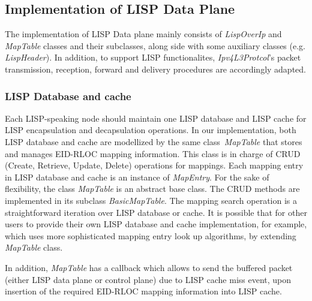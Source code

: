 \subsection{Implementation of LISP Data Plane}
\label{subsec:modifyInternet}
The implementation of LISP Data plane mainly consists of \emph{LispOverIp} and \emph{MapTable} classes and their subclasses, along side with some auxiliary classes (e.g. \emph{LispHeader}). In addition, to support LISP functionalites, \emph{Ipv4L3Protcol}'s packet transmission, reception, forward and delivery procedures are accordingly adapted.
\subsubsection{LISP Database and cache}
\label{subsec:database-impl}
Each LISP-speaking node should maintain one LISP database and LISP cache for LISP encapsulation and decapsulation operations. In our implementation, both LISP database and cache are modellized by the same class~\emph{MapTable} that stores and manages EID-RLOC mapping information. This class is in charge of CRUD (Create, Retrieve, Update, Delete) operations for mappings. Each mapping entry in LISP database and cache is an instance of \emph{MapEntry}. For the sake of flexibility, the class \emph{MapTable} is an abstract base class. The CRUD methods are implemented in its subclass \emph{BasicMapTable}. The mapping search operation is a straightforward iteration over LISP database or cache. It is possible that for other users to provide their own LISP database and cache implementation, for example, which uses more sophisticated mapping entry look up algorithms, by extending \emph{MapTable} class.

In addition, \emph{MapTable} has a callback which allows to send the buffered packet (either LISP data plane or control plane) due to LISP cache miss event, upon insertion of the required EID-RLOC mapping information into LISP cache.

